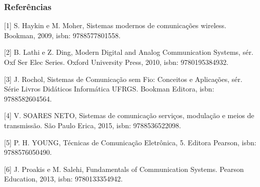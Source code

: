 \documentclass[10pt,hyperref={pdfpagemode=FullScreen},aspectratio=169]{beamer}
\begin{document}
\begin{frame}
  \frametitle{Referências}

[1] S. Haykin e M. Moher, Sistemas modernos de comunicações wireless. Bookman, 2009, isbn: 9788577801558.

[2] B. Lathi e Z. Ding, Modern Digital and Analog Communication Systems, sér. Oxf Ser Elec Series. Oxford University Press, 2010, isbn: 9780195384932.

[3] J. Rochol, Sistemas de Comunicação sem Fio: Conceitos e Aplicações, sér. Série Livros Didáticos Informática UFRGS. Bookman Editora, isbn: 9788582604564.

[4] V. SOARES NETO, Sistemas de comunicação serviços, modulação e meios de transmissão. São Paulo Erica, 2015, isbn: 9788536522098.

[5] P. H. YOUNG, Técnicas de Comunicação Eletrônica, 5. Editora Pearson, isbn: 9788576050490.

[6] J. Proakis e M. Salehi, Fundamentals of Communication Systems. Pearson Education, 2013, isbn: 9780133354942.

\end{frame}
\end{document}

